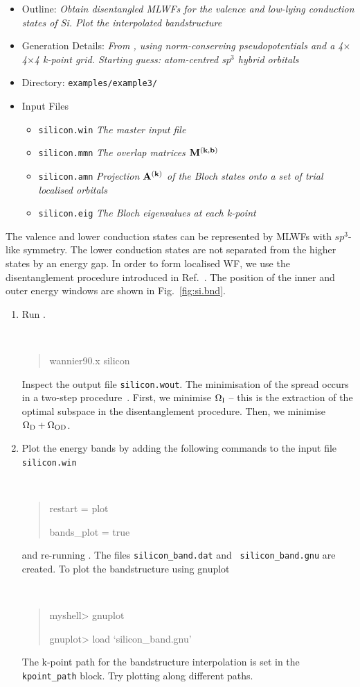 \documentclass[a4paper,11pt,twoside]{article}
\begin{document}



\begin{itemize}
\item{Outline: \it{Obtain disentangled MLWFs for the valence and
      low-lying conduction states of Si. Plot the interpolated
      bandstructure}}
\item{Generation Details: \it{From \pwscf, using norm-conserving
    pseudopotentials and a 4$\times$4$\times$4 k-point grid. Starting
    guess: atom-centred sp$^3$ hybrid orbitals}} 
\item{Directory: {\tt examples/example3/}}
\item{Input Files}
\begin{itemize}
\item{ {\tt silicon.win}  {\it The master input file}}
\item{ {\tt silicon.mmn}  {\it The overlap matrices $\mathbf{M}^{(\mathbf{k},\mathbf{b})}$}}
\item{ {\tt silicon.amn}  {\it Projection $\mathbf{A}^{(\mathbf{k})}$ of the Bloch states onto a
    set of trial localised orbitals}} 
\item{ {\tt silicon.eig}  {\it The Bloch eigenvalues at each k-point}}
\end{itemize}
\end{itemize}
The valence and lower conduction states can be represented by MLWFs
with $sp^3$-like symmetry. The lower conduction states are not 
separated from the higher states by an energy gap. In order to form
localised WF, we use the disentanglement procedure
introduced in Ref.~\cite{souza-prb01}. The position of the inner and outer
energy windows are shown in Fig.~\ref{fig:si.bnd}. 
\begin{enumerate}
\item Run \wannier.
{\tt
\begin{quote}
wannier90.x silicon
\end{quote} }
Inspect the output file {\tt silicon.wout}. The minimisation of the
spread occurs in a two-step procedure~\cite{souza-prb01}. First, we minimise
$\Omega_{\rm I}$ -- this is the extraction of the optimal subspace in
the disentanglement procedure. Then, we minimise $\Omega_{\rm D} +
\Omega_{{\rm OD}}$.

\item Plot the energy bands by adding the following
  commands to the input file {\tt silicon.win} {\tt
\begin{quote}
restart = plot

bands\_plot = true
\end{quote} }
and re-running \wannier. The files {\tt silicon\_band.dat} and {\tt
  silicon\_band.gnu} are created. 
To plot the bandstructure using gnuplot
\smallskip
{\tt
\begin{quote}
myshell> gnuplot

gnuplot> load `silicon\_band.gnu'
\end{quote} }
The k-point path for the bandstructure interpolation is set in the {\tt
  kpoint\_path} block. Try plotting along different paths. 
\end{enumerate}
\end{document}
